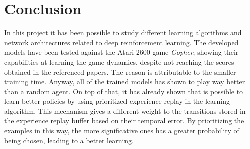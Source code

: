 \documentclass[article,11pt]{article}
\begin{document}
	\section{Conclusion}
	In this project it has been possible to study different learning algorithms and network architectures related to deep reinforcement learning. The developed models have been tested against the Atari 2600 game \textit{Gopher}, showing their capabilities at learning the game dynamics, despite not reaching the scores obtained in the referenced papers. The reason is attributable to the smaller training time. Anyway, all of the trained models has shown to play way better than a random agent.
	On top of that, it has already shown that is possible to learn better policies by using prioritized experience replay \cite{prioritized} in the learning algorithm. This mechanism gives a different weight to the transitions stored in the experience replay buffer based on their temporal error. By prioritizing the examples in this way, the more significative ones has a greater probability of being chosen, leading to a better learning.
	
	
	
\end{document}
